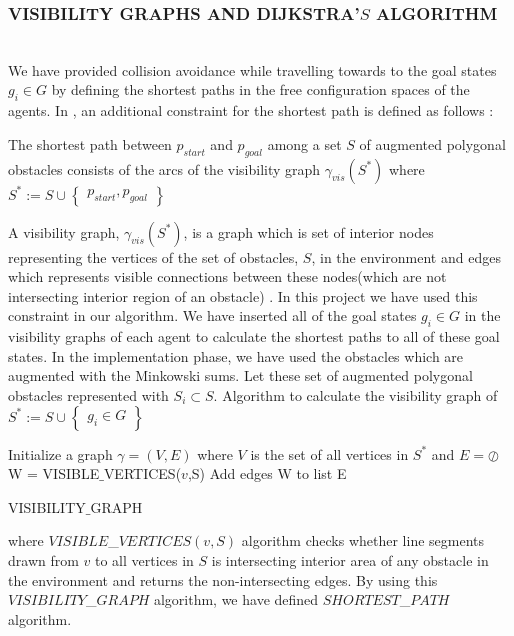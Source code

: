 \documentclass[letterpaper, 10 pt, conference]{ieeeconf}  %
\begin{document}
\subsubsection{VISIBILITY GRAPHS AND DIJKSTRA'$S$ ALGORITHM}\hspace{0pt} \\
We have provided collision avoidance while travelling towards to the goal states $g_i \in G$ by defining the shortest paths in the free configuration spaces of the agents. In \cite{92}, an additional constraint for the shortest path is defined as follows : 

\begin{displayquote}
The shortest path between $p_{start}$ and $p_{goal}$ among a set $S$ of augmented polygonal obstacles consists of the arcs of the visibility graph $\gamma_{vis}(S^*)$ where $S^* := S \cup \begin{Bmatrix}
p_{start}, p_{goal}
\end{Bmatrix}$
\end{displayquote}

A visibility graph, $\gamma_{vis}(S^*)$, is a graph which is set of interior nodes representing the vertices of the set of obstacles, $S$, in the environment and edges which represents visible connections between these nodes(which are not intersecting interior region of an obstacle) \cite{92}. In this project we have used this constraint in our algorithm. We have inserted all of the goal states $g_i \in G$ in the visibility graphs of each agent to calculate the shortest paths to all of these goal states. In the implementation phase, we have used the obstacles which are augmented with the Minkowski sums. Let these set of augmented polygonal obstacles represented with $S_i \subset S$. Algorithm to calculate the visibility graph of  $S^* := S \cup \begin{Bmatrix}
g_i \in G
\end{Bmatrix}$
	
\begin{algorithm}
Initialize a graph $\gamma = (V,E)$ where $V$ is the set of all vertices in $S^*$ and $E = \oslash$  \\
{		
W = VISIBLE$\_$VERTICES($v$,S)\;
Add edges W to list E\;
}\

\caption{VISIBILITY$\_$GRAPH}
\end{algorithm}

where $VISIBLE$\_$VERTICES(v,S)$ algorithm checks whether line segments drawn from $v$ to all vertices in $S$ is intersecting interior area of any obstacle in the environment and returns the non-intersecting edges.  By using this $VISIBILITY$\_$GRAPH$ algorithm, we have defined $SHORTEST$\_$PATH$ algorithm.
	
\end{document}
